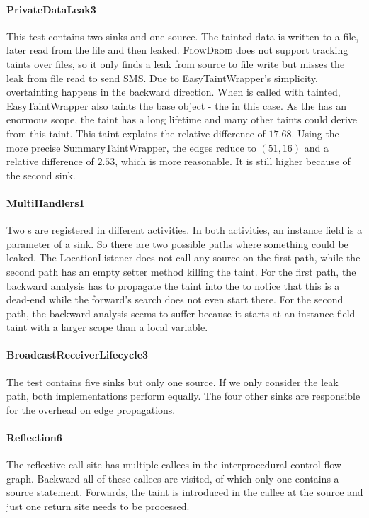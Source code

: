 \documentclass[../draft.tex]{subfiles}
\begin{document}
    \paragraph{PrivateDataLeak3} 
    This test contains two sinks and one source. 
    The tainted data is written to a file, later read from the file and then leaked. 
    \textsc{FlowDroid} does not support tracking taints over files, so it only finds a leak from source to file write but misses the leak from file read to send SMS. 
    Due to EasyTaintWrapper's simplicity, overtainting happens in the backward direction. When  is called with  tainted, EasyTaintWrapper also taints the base object - the  in this case. 
    As the  has an enormous scope, the taint has a long lifetime and many other taints could derive from this taint. 
    This taint explains the relative difference of $17.68$.
    Using the more precise SummaryTaintWrapper, the edges reduce to $(51, 16)$ and a relative difference of $2.53$, which is more reasonable. 
    It is still higher because of the second sink. 

    \paragraph{MultiHandlers1}
    Two s are registered in different activities. 
    In both activities, an instance field is a parameter of a sink.
    So there are two possible paths where something could be leaked. 
    The LocationListener does not call any source on the first path, while the second path has an empty setter method killing the taint.
    For the first path, the backward analysis has to propagate the taint into the  to notice that this is a dead-end while the forward's search does not even start there.
    For the second path, the backward analysis seems to suffer because it starts at an instance field taint with a larger scope than a local variable.

    \paragraph{BroadcastReceiverLifecycle3}
    The test contains five sinks but only one source. 
    If we only consider the leak path, both implementations perform equally. 
    The four other sinks are responsible for the overhead on edge propagations.
    
    \paragraph{Reflection6}
    The reflective call site has multiple callees in the interprocedural control-flow graph. 
    Backward all of these callees are visited, of which only one contains a source statement. 
    Forwards, the taint is introduced in the callee at the source and just one return site needs to be processed.
\end{document}
